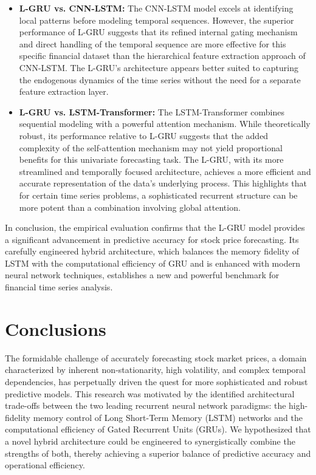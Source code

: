 \documentclass{cys}
\begin{document}
\begin{enumerate}
\begin{itemize}
        \item \textbf{L-GRU vs. CNN-LSTM:}
        The CNN-LSTM model excels at identifying local patterns before modeling temporal sequences. However, the superior performance of L-GRU suggests that its refined internal gating mechanism and direct handling of the temporal sequence are more effective for this specific financial dataset than the hierarchical feature extraction approach of CNN-LSTM. The L-GRU's architecture appears better suited to capturing the endogenous dynamics of the time series without the need for a separate feature extraction layer.
        \item \textbf{L-GRU vs. LSTM-Transformer:}
        The LSTM-Transformer combines sequential modeling with a powerful attention mechanism. While theoretically robust, its performance relative to L-GRU suggests that the added complexity of the self-attention mechanism may not yield proportional benefits for this univariate forecasting task. The L-GRU, with its more streamlined and temporally focused architecture, achieves a more efficient and accurate representation of the data's underlying process. This highlights that for certain time series problems, a sophisticated recurrent structure can be more potent than a combination involving global attention.
    \end{itemize}
    In conclusion, the empirical evaluation confirms that the L-GRU model provides a significant advancement in predictive accuracy for stock price forecasting. Its carefully engineered hybrid architecture, which balances the memory fidelity of LSTM with the computational efficiency of GRU and is enhanced with modern neural network techniques, establishes a new and powerful benchmark for financial time series analysis.
    \end{enumerate}
\section{Conclusions}\label{sec:conclusion}
The formidable challenge of accurately forecasting stock market prices, a domain characterized by inherent non-stationarity, high volatility, and complex temporal dependencies, has perpetually driven the quest for more sophisticated and robust predictive models. This research was motivated by the identified architectural trade-offs between the two leading recurrent neural network paradigms: the high-fidelity memory control of Long Short-Term Memory (LSTM) networks and the computational efficiency of Gated Recurrent Units (GRUs). We hypothesized that a novel hybrid architecture could be engineered to synergistically combine the strengths of both, thereby achieving a superior balance of predictive accuracy and operational efficiency.
\end{document}
